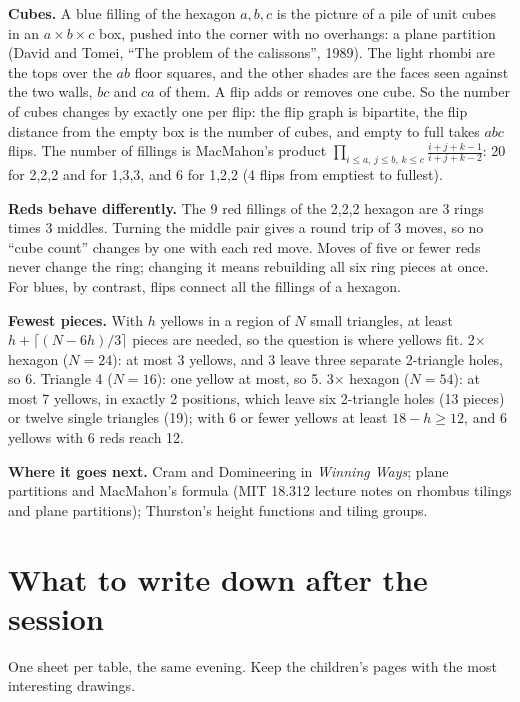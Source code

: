 \documentclass[10pt]{article}
\begin{document}
\textbf{Cubes.} A blue filling of the hexagon $a,b,c$ is the picture of a pile of unit cubes in an $a\times b\times c$ box, pushed into the corner with no overhangs: a plane partition (David and Tomei, ``The problem of the calissons'', 1989). The light rhombi are the tops over the $ab$ floor squares, and the other shades are the faces seen against the two walls, $bc$ and $ca$ of them. A flip adds or removes one cube. So the number of cubes changes by exactly one per flip: the flip graph is bipartite, the flip distance from the empty box is the number of cubes, and empty to full takes $abc$ flips. The number of fillings is MacMahon's product $\prod_{i\le a,\,j\le b,\,k\le c}\frac{i+j+k-1}{i+j+k-2}$: 20 for 2,2,2 and for 1,3,3, and 6 for 1,2,2 (4 flips from emptiest to fullest).

\textbf{Reds behave differently.} The 9 red fillings of the 2,2,2 hexagon are 3 rings times 3 middles. Turning the middle pair gives a round trip of 3 moves, so no ``cube count'' changes by one with each red move. Moves of five or fewer reds never change the ring; changing it means rebuilding all six ring pieces at once. For blues, by contrast, flips connect all the fillings of a hexagon.

\textbf{Fewest pieces.} With $h$ yellows in a region of $N$ small triangles, at least $h+\lceil (N-6h)/3\rceil$ pieces are needed, so the question is where yellows fit. 2$\times$ hexagon ($N=24$): at most 3 yellows, and 3 leave three separate 2-triangle holes, so 6. Triangle 4 ($N=16$): one yellow at most, so 5. 3$\times$ hexagon ($N=54$): at most 7 yellows, in exactly 2 positions, which leave six 2-triangle holes (13 pieces) or twelve single triangles (19); with 6 or fewer yellows at least $18-h\ge 12$, and 6 yellows with 6 reds reach 12.

\textbf{Where it goes next.} Cram and Domineering in \emph{Winning Ways}; plane partitions and MacMahon's formula (MIT 18.312 lecture notes on rhombus tilings and plane partitions); Thurston's height functions and tiling groups.

\section{What to write down after the session}

One sheet per table, the same evening. Keep the children's pages with the most interesting drawings.
\end{document}
